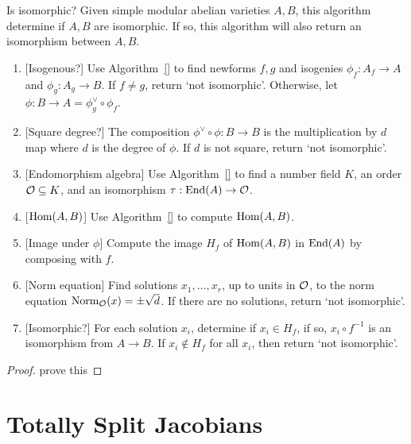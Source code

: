 \documentclass[11pt, proquest]{uwthesis}
\begin{document}
\begin{algorithm}{Is isomorphic?}%
    \label{is_isomorphic}
    Given simple modular abelian varieties $A, B$, this algorithm determine if
    $A, B$ are isomorphic. If so, this algorithm will also return an
    isomorphism between $A, B$.
    \begin{enumerate}
        \item{}
            [Isogenous?] Use Algorithm~\ref{} to find newforms $f,g$ and
            isogenies $\phi_f:A_f\to A$ and $\phi_g:A_g\to B$. If $f\neq g$,
            return `not isomorphic'. Otherwise, let $\phi:B\to A=\phi_g ^\vee
            \circ \phi_f$.
        \item{}
            [Square degree?] The composition $\phi^\vee \circ \phi:B\to B$ is
            the multiplication by $d$ map where $d$ is the degree of $\phi$. If
            $d$ is not square, return `not isomorphic'.
        \item{}
            [Endomorphism algebra] Use Algorithm~\ref{} to find a number field
            $K$, an order $\mathcal{O}\subseteq K$, and an isomorphism $\tau:\operatorname{End}(A)\to
            \mathcal{O}$.
        \item{}
            [$\operatorname{Hom}(A, B)$] Use Algorithm~\ref{} to compute $\operatorname{Hom}(A,B)$.
        \item{}
            [Image under $\phi$] Compute the image $H_f$ of $\operatorname{Hom}(A, B)$ in
            $\operatorname{End}(A)$ by composing with $f$.
        \item{}
            [Norm equation] Find solutions $x_1,\ldots,x_r$, up to units in
            $\mathcal{O}$, to the norm equation $\operatorname{Norm}_{\mathcal{O}} (x) = \pm \sqrt{d}$. If
            there are no solutions, return `not isomorphic'.
        \item{}
            [Isomorphic?] For each solution $x_i$, determine if $x_i\in H_f$,
            if so, $x_i \circ f^{-1}$ is an isomorphism from $A\to B$. If
            $x_i\notin H_f$ for all $x_i$, then return `not isomorphic'.
    \end{enumerate}
\end{algorithm}
\begin{proof}
    prove this
\end{proof}

\chapter{Totally Split Jacobians}%
\label{chap:totally_split}
\end{document}
